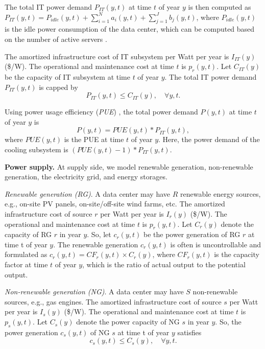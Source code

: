 The total IT power demand $P_{IT}(y,t)$ at time $t$ of year $y$ is then computed as
$P_{IT}(y,t) = P_{idle}(y,t) + \sum_{i=1}^{N} a_i(y,t) + \sum_{j=1}^{J} b_j(y,t)$, where $P_{idle}(y,t)$ is the idle power consumption of the data center, which can be computed based on the number of active servers \cite{lin2013dynamic}.

The amortized infrastructure cost of IT subsystem per Watt per year is $I_{IT}(y)$ (\$/W). The operational and maintenance cost at time $t$ is $p_{r}(y,t)$. Let $C_{IT}(y)$ be the capacity of IT subsystem at time $t$ of year $y$. The total IT power demand $P_{IT}(y,t)$ is capped by
\begin{equation}
\label{const:IT_capacity}
P_{IT}(y,t) \leq C_{IT}(y), \quad \forall y,t.
\end{equation}

Using power usage efficiency (\textit{PUE}) \cite{barroso2013datacenter}, the total power demand $P(y,t)$ at time $t$ of year $y$ is 
$$P(y,t)=PUE(y,t)*P_{IT}(y,t),$$ where $PUE(y,t)$ is the PUE at time $t$ of year $y$. Here, the power demand of the cooling subsystem is $(PUE(y,t)-1)*P_{IT}(y,t)$.

\textbf{Power supply.} At supply side, we model renewable generation, non-renewable generation, the electricity grid, and energy storages.
    
\textit{Renewable generation (RG)}. A data center may have $R$ renewable energy sources, e.g., on-site PV panels, on-site/off-site wind farms, etc. The amortized infrastructure cost of source $r$ per Watt per year is $I_{r}(y)$ (\$/W). The operational and maintenance cost at time $t$ is $p_{r}(y,t)$. Let $C_{r}(y)$ denote the capacity of RG $r$ in year $y$. So, let  $c_r(y,t)$ be the power generation of RG $r$ at time t of year $y$. The renewable generation $c_r(y,t)$ is often is uncontrollable and formulated as $c_r(y,t)=CF_r(y,t) \times C_{r}(y)$, where $CF_r(y,t)$ is the capacity factor at time $t$ of year $y$, which is the ratio of actual output to the potential output.

\textit{Non-renewable generation (NG)}. A data center may have $S$ non-renewable sources, e.g., gas engines. The amortized infrastructure cost of source $s$ per Watt per year is $I_{s}(y)$ (\$/W). The operational and maintenance cost at time $t$ is $p_{s}(y,t)$. Let $C_{s}(y)$ denote the power capacity of NG $s$ in year $y$. So, the power generation $c_s(y,t)$ of NG
 $s$ at time t of year $y$ satisfies
\begin{equation}
\label{const:DG_capacity}
c_{s}(y,t) \leq C_{s}(y), \quad \forall y,t.
\end{equation}

